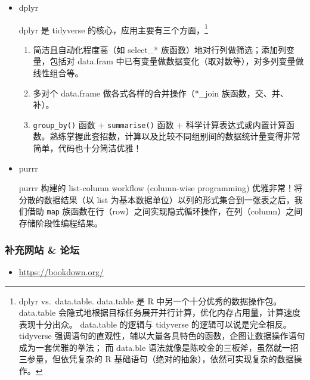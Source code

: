 \documentclass[11pt,hyperref]{ctexart}
\providecommand{\tightlist}{%
  \setlength{\itemsep}{0pt}\setlength{\parskip}{0pt}}
\begin{document}
\begin{itemize}
\item
  dplyr

  dplyr 是 tidyverse 的核心，应用主要有三个方面，\footnote{dplyr
    vs.~data.table. data.table 是 R 中另一个十分优秀的数据操作包。
    data.table
    会隐式地根据目标任务展开并行计算，优化内存占用量，计算速度表现十分出众。
    data.table 的逻辑与 tidyverse 的逻辑可以说是完全相反。 tidyverse
    强调语句的直观性，辅以大量各具特色的函数，企图让数据操作语句成为一套优雅的拳法；
    而 data.ble 语法就像是陈咬金的三板斧，虽然就一招三参量，但依凭复杂的
    R 基础语句（绝对的抽象），依然可实现复杂的数据操作。}

  \begin{enumerate}
  \def\labelenumi{\arabic{enumi}.}
  \item
    简洁且自动化程度高（如 select\_*
    族函数）地对行列做筛选；添加列变量，包括对 data.fram
    中已有变量做数据变化（取对数等），对多列变量做线性组合等。
  \item
    多对个 data.frame 做各式各样的合并操作（*\_join
    族函数，交、并、补）。
  \item
    \texttt{group\_by()} 函数 + \texttt{summarise()} 函数 +
    科学计算表达式或内置计算函数。熟练掌握此套招数，计算以及比较不同组别间的数据统计量变得非常简单，代码也十分简洁优雅！
  \end{enumerate}
\item
  purrr

  purrr 构建的 list-column workflow (column-wise programming)
  优雅非常！将分散的数据结果（以 list
  为基本数据单位）以列的形式集合到一张表之后，我们借助 \texttt{map}
  族函数在行（row）之间实现隐式循环操作，在列（column）之间存储阶段性编程结果。
\end{itemize}

\hypertarget{ux8865ux5145ux7f51ux7ad9-ux8bbaux575b}{%
\subsubsection{补充网站 \&
论坛}\label{ux8865ux5145ux7f51ux7ad9-ux8bbaux575b}}

\begin{itemize}
\tightlist
\item
  \url{https://bookdown.org/}
\end{itemize}
\end{document}
